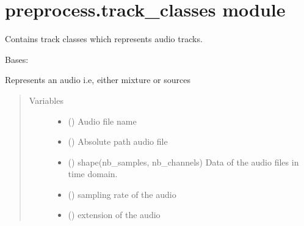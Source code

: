 \documentclass[letterpaper,10pt,english]{sphinxmanual}
\begin{document}
\section{preprocess.track\_classes module}
\label{\detokenize{docs/source/preprocess:module-preprocess.track_classes}}\label{\detokenize{docs/source/preprocess:preprocess-track-classes-module}}
Contains track classes which represents audio tracks.

\begin{fulllineitems}
\label{\detokenize{docs/source/preprocess:preprocess.track_classes.Audio}}
Bases: 

Represents an audio i.e, either mixture or sources
\begin{quote}\begin{description}
\item[{Variables}] \leavevmode\begin{itemize}
\item {} 
 () \textendash{} Audio file name

\item {} 
 () \textendash{} Absolute path audio file

\item {} 
 () \textendash{} shape(nb\_samples, nb\_channels)
Data of the audio files in time domain.

\item {} 
 () \textendash{} sampling rate of the audio

\item {} 
 () \textendash{} extension of the audio

\end{itemize}


\end{description}
\end{quote}
\end{fulllineitems}
\end{document}
